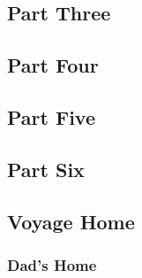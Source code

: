 \subsection{Part Three}


\subsection{Part Four}


\subsection{Part Five}


\subsection{Part Six}


\subsection{Voyage Home}


\subsubsection{Dad's Home}

